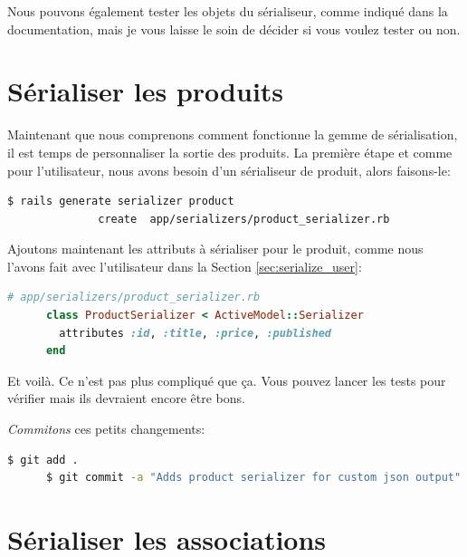 \documentclass[]{report}
\begin{document}
    Nous pouvons également tester les objets du sérialiseur, comme indiqué dans la documentation, mais je vous laisse le soin de décider si vous voulez tester ou non.

  \section{Sérialiser les produits}

    Maintenant que nous comprenons comment fonctionne la gemme de sérialisation, il est temps de personnaliser la sortie des produits. La première étape et comme pour l'utilisateur, nous avons besoin d'un sérialiseur de produit, alors faisons-le:

    \begin{scriptsize}
      \begin{lstlisting}[language=bash]
      $ rails generate serializer product
              create  app/serializers/product_serializer.rb
      \end{lstlisting}
    \end{scriptsize}

    Ajoutons maintenant les attributs à sérialiser pour le produit, comme nous l'avons fait avec l'utilisateur dans la Section \ref{sec:serialize_user}:

    \begin{scriptsize}
      \begin{lstlisting}[language=ruby]
      # app/serializers/product_serializer.rb
      class ProductSerializer < ActiveModel::Serializer
        attributes :id, :title, :price, :published
      end
      \end{lstlisting}
    \end{scriptsize}

    Et voilà. Ce n'est pas plus compliqué que ça. Vous pouvez lancer les tests pour vérifier mais ils devraient encore être bons.

    \textit{Commitons} ces petits changements:

    \begin{scriptsize}
      \begin{lstlisting}[language=bash]
      $ git add .
      $ git commit -a "Adds product serializer for custom json output"
      \end{lstlisting}
    \end{scriptsize}

  \section{Sérialiser les associations}
\end{document}

